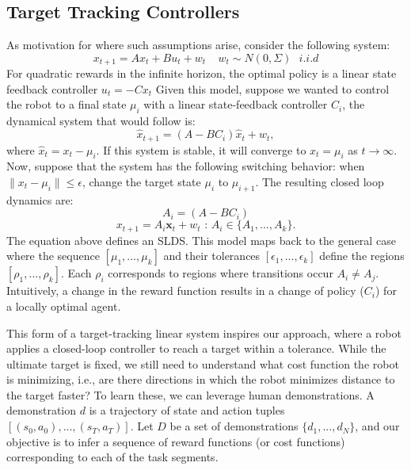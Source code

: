 \subsection{Target Tracking Controllers}
As motivation for where such assumptions arise, consider the following system:
\[
x_{t+1} = Ax_{t} + Bu_{t} + w_{t}~~~~~w_{t} \sim N(0, \Sigma)~~~i.i.d 
\]
For quadratic rewards in the infinite horizon, the optimal policy is a linear state feedback controller $u_{t} = - C x_{t}$
Given this model, suppose we wanted to control the robot to a final state $\mu_i$ with a linear state-feedback controller $C_i$, the dynamical system that would follow is:
\[
\hat{x}_{t+1} = (A - B C_i) \hat{x}_t + w_t,
\]
where $\hat{x}_{t}  = x_t - \mu_i$. 
If this system is stable, it will converge to $x_{t} = \mu_i$ as $t \rightarrow \infty$.
Now, suppose that the system has the following switching behavior: when $\| x_{t} - \mu_i \| \le \epsilon$, change the target state $\mu_i$ to $\mu_{i+1}$.
The resulting closed loop dynamics are:
\[
A_i = (A - B C_i)
\]
\[
x_{t+1} = A_{i}\mathbf{x}_t + w_{t} \text{ : } A_i \in \{A_1,...,A_k\}.
\]
The equation above defines an SLDS.
This model maps back to the general case where the sequence $[\mu_1,...,\mu_k]$ and their tolerances $[\epsilon_1,...,\epsilon_k]$ define the regions $[\rho_1,...,\rho_k]$.
Each $\rho_i$ corresponds to regions where transitions occur $A_i \ne A_j$.
Intuitively, a change in the reward function results in a change of policy ($C_i$) for a locally optimal agent.

This form of a target-tracking linear system inspires our approach, where a robot applies a closed-loop controller to reach a target within a tolerance.
While the ultimate target is fixed, we still need to understand what cost function the robot is minimizing, i.e., are there directions in which the robot minimizes distance to the target faster? 
To learn these, we can leverage human demonstrations.
A demonstration $d$ is a trajectory of state and action tuples $[(s_0,a_0),...,(s_T,a_T)]$. 
Let $D$ be a set of demonstrations $\{d_1,...,d_N\}$, and our objective is to infer a sequence of reward functions (or cost functions) corresponding to each of the task segments.










